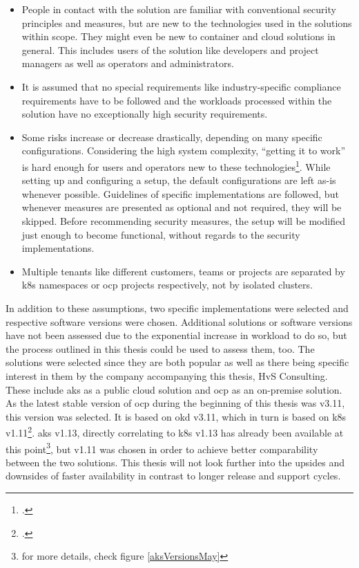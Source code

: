 \begin{itemize}

\item People in contact with the solution are familiar with conventional security principles and measures, but are new to the technologies used in the solutions within scope. They might even be new to container and cloud solutions in general. This includes users of the solution like developers and project managers as well as operators and administrators.

\item It is assumed that no special requirements like industry-specific compliance requirements have to be followed and the workloads processed within the solution have no exceptionally high security requirements. 

\item Some risks increase or decrease drastically, depending on many specific configurations. Considering the high system complexity, ``getting it to work'' is hard enough for users and operators new to these technologies\footcite[][, starting at 3:05]{hackAndHarden}. While setting up and configuring a setup, the default configurations are left as-is whenever possible. Guidelines of specific implementations are followed, but whenever measures are presented as optional and not required, they will be skipped. Before recommending security measures, the setup will be modified just enough to become functional, without regards to the security implementations.

\item Multiple tenants like different customers, teams or projects are separated by \gls{k8s} namespaces or \gls{ocp} projects respectively, not by isolated clusters.

\end{itemize}

In addition to these assumptions, two specific implementations were selected and respective software versions were chosen. Additional solutions or software versions have not been assessed due to the exponential increase in workload to do so, but the process outlined in this thesis could be used to assess them, too.
The solutions were selected since they are both popular as well as there being specific interest in them by the company accompanying this thesis, HvS Consulting.
These include \gls{aks} as a public cloud solution and \gls{ocp} as an on-premise solution. As the latest stable version of \gls{ocp} during the beginning of this thesis was v3.11, this version was selected. It is based on \gls{okd} v3.11, which in turn is based on \gls{k8s} v1.11\footcite[][, refer to the second table below the headline 'Platform Components']{ocpK8sVersions}. \gls{aks} v1.13, directly correlating to \gls{k8s} v1.13 has already been available at this point\footnote{for more details, check figure \ref{aksVersionsMay}}, but v1.11 was chosen in order to achieve better comparability between the two solutions. This thesis will not look further into the upsides and downsides of faster availability in contrast to longer release and support cycles.


